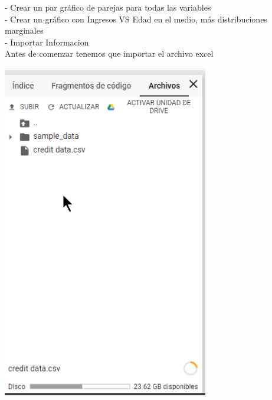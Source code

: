 \documentclass[12pt,letterpaper]{article}
\begin{document}
- Crear un par gr\'afico de parejas para todas las variables\\
- Crear un gr\'afico con Ingresos VS Edad en el medio, m\'as distribuciones marginales\\

- Importar Informacion\\

Antes de comenzar tenemos que importar el archivo excel\\
\begin{center}
\includegraphics[width=9cm]{IMG/1.png} 
\end{center}
\end{document}
